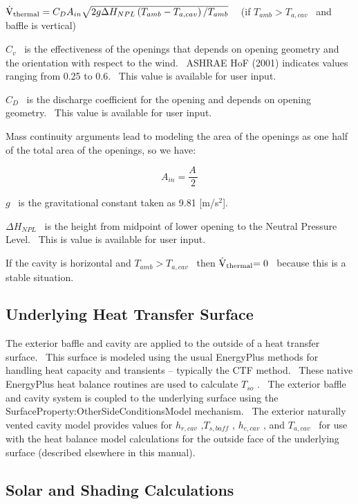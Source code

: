 \({{\rm{\rlap{--} \dot V}}_{{\rm{thermal}}}} = {C_D}{A_{in}}\sqrt {2g\Delta {H_{NPL}}\left( {{T_{amb}} - {T_{a,cav}}} \right)/{T_{amb}}}\) ~ (if \(T_{amb} > T_{a,cav}\) ~and baffle is vertical)

\({C_v}\) ~is the effectiveness of the openings that depends on opening geometry and the orientation with respect to the wind.~ ASHRAE HoF (2001) indicates values ranging from 0.25 to 0.6.~ This value is available for user input.

\({C_D}\) ~is the discharge coefficient for the opening and depends on opening geometry.~ This value is available for user input.

Mass continuity arguments lead to modeling the area of the openings as one half of the total area of the openings, so we have:

\begin{equation}
{A_{in}} = \frac{{A\,}}{2}
\end{equation}

\(g\) ~is the gravitational constant taken as 9.81 {[}m/s\(^{2}\){]}.

\(\Delta {H_{NPL}}\) ~is the height from midpoint of lower opening to the Neutral Pressure Level.~ This is value is available for user input.

If the cavity is horizontal and \(T_{amb} > T_{a,cav}\) ~then \({{\rm{\rlap{--} \dot V}}_{{\rm{thermal}}}}{\rm{ = 0}}\) ~because this is a stable situation.

\subsection{Underlying Heat Transfer Surface}\label{underlying-heat-transfer-surface}

The exterior baffle and cavity are applied to the outside of a heat transfer surface.~ This surface is modeled using the usual EnergyPlus methods for handling heat capacity and transients -- typically the CTF method.~ These native EnergyPlus heat balance routines are used to calculate \({T_{so}}\) .~ The exterior baffle and cavity system is coupled to the underlying surface using the SurfaceProperty:OtherSideConditionsModel mechanism.~ The exterior naturally vented cavity model provides values for \({h_{r,cav}}\) ,\({T_{s,baff}}\) , \({h_{c,cav}}\) , and \({T_{a,cav}}\) ~for use with the heat balance model calculations for the outside face of the underlying surface (described elsewhere in this manual).

\subsection{Solar and Shading Calculations}\label{solar-and-shading-calculations}

